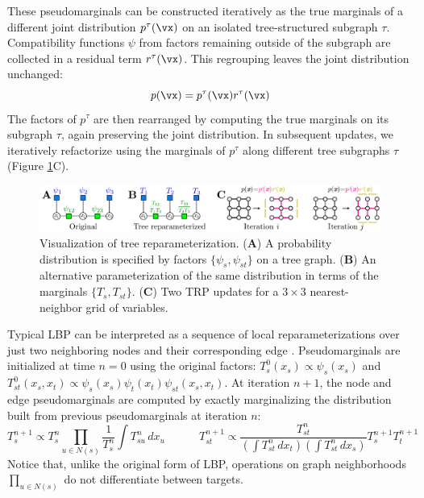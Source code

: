 \documentclass{article}
\begin{document}
These pseudomarginals can be constructed iteratively as the true marginals of a different joint distribution $p^\tau(\vx)$ on an isolated tree-structured subgraph $\tau$. Compatibility functions $\psi$ from factors remaining outside of the subgraph are collected in a residual term $r^\tau(\vx)$. This regrouping leaves the joint distribution unchanged:
\begin{equation}
p(\vx) = p^\tau(\vx)r^\tau(\vx)
\end{equation}
The factors of $p^\tau$ are then rearranged by computing the true marginals on its subgraph $\tau$, again preserving the joint distribution. In subsequent updates, we iteratively refactorize using the marginals of $p^\tau$ along different tree subgraphs $\tau$ (Figure \ref{fig:TRP2}C).

\begin{figure}[h]
\centering
\includegraphics[width=1\textwidth]{Figures/TRPBoth2.pdf}
\caption{Visualization of tree reparameterization. ({\bf A}) A probability distribution is specified by factors $\{\psi_s, \psi_{st}\}$ on a tree graph. ({\bf B}) An alternative parameterization of the same distribution in terms of the marginals $\{T_s, T_{st}\}$. ({\bf C}) Two TRP updates for a $3\times 3$ nearest-neighbor grid of variables.}
\label{fig:TRP2}
\end{figure}

Typical LBP can be interpreted as a sequence of local reparameterizations over just two neighboring nodes and their corresponding edge \cite{wainwright2003tree}. Pseudomarginals are initialized at time $n=0$ using the original factors: $T_s^0(x_s) \propto \psi_s(x_s)$ and $T_{st}^0(x_s,x_t) \propto \psi_s(x_s)\psi_t(x_t)\psi_{st}(x_s,x_t)$. At iteration $n+1$, the node and edge pseudomarginals are computed by exactly marginalizing the distribution built from previous pseudomarginals at iteration $n$:
\begin{equation}
\label{BPTRP}
T_s^{n+1} \propto T_s^{n}\!\!\! \prod_{u\in N(s)}\!\frac{1}{T_s^{n}} \int \! T_{su}^{n}\,dx_u
\hspace{3em}
T_{st}^{n+1} \propto \frac{T_{st}^{n}}{\left(\int \!{T_{st}^{n}\,dx_t}\right) \left(\int \! {T_{st}^{n}\, dx_s}\right)}T_s^{n+1}T_t^{n+1}
\end{equation}
Notice that, unlike the original form of LBP, operations on graph neighborhoods $\prod_{u\in N(s)}$ do not differentiate between targets.
\end{document}
